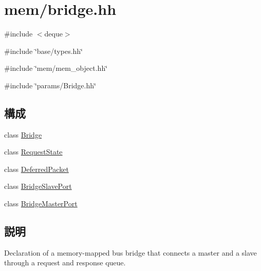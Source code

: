 \hypertarget{bridge_8hh}{
\section{mem/bridge.hh}
\label{bridge_8hh}
}
{\ttfamily \#include $<$deque$>$}\par
{\ttfamily \#include \char`\"{}base/types.hh\char`\"{}}\par
{\ttfamily \#include \char`\"{}mem/mem\_\-object.hh\char`\"{}}\par
{\ttfamily \#include \char`\"{}params/Bridge.hh\char`\"{}}\par
\subsection*{構成}
\begin{DoxyCompactItemize}
\item 
class \hyperlink{classBridge}{Bridge}
\item 
class \hyperlink{classBridge_1_1RequestState}{RequestState}
\item 
class \hyperlink{classBridge_1_1DeferredPacket}{DeferredPacket}
\item 
class \hyperlink{classBridge_1_1BridgeSlavePort}{BridgeSlavePort}
\item 
class \hyperlink{classBridge_1_1BridgeMasterPort}{BridgeMasterPort}
\end{DoxyCompactItemize}


\subsection{説明}
Declaration of a memory-\/mapped bus bridge that connects a master and a slave through a request and response queue. 